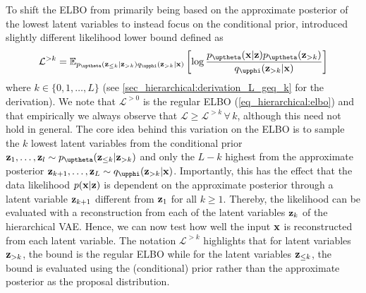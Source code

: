 {To shift the ELBO from primarily being based on the approximate posterior of the lowest latent variables to instead focus on the conditional prior, \textcite{maaloe_biva_2019} introduced slightly different likelihood lower bound defined as
\begin{equation}\label{eq_hierarchical:biva->k}
    \mathcal{L}^{>k} = \mathbb{E}_{p_\thetab(\zb_{\leq k}|\zb_{>k}) q_\phib(\zb_{>k}|\xb)} \left[ \log \frac{p_\thetab(\xb|\zb)p_\thetab(\zb_{>k})}{q_\phib(\zb_{>k}|\xb)} \right]
\end{equation}
where $k\in\{0,1,\dots,L\}$ (see \cref{sec_hierarchical:derivation_L_geq_k} for the derivation).
We note that $\mathcal{L}^{>0}$ is the regular ELBO (\cref{eq_hierarchical:elbo}) and that empirically we always observe that $\mathcal{L}\geq\mathcal{L}^{>k} \, \forall \, k$, although this need not hold in general.
The core idea behind this variation on the ELBO is to sample the $k$ lowest latent variables from the conditional prior $\zb_1,\dots,\zb_l \sim p_\thetab(\zb_{\leq k}|\zb_{>k})$ and only the $L-k$ highest from the approximate posterior $\zb_{k+1},\dots,\zb_L \sim q_\phib(\zb_{>k}|\xb)$.
Importantly, this has the effect that the data likelihood $p({\mathbf{x}}|{\mathbf{z}})$ is dependent on the approximate posterior through a latent variable ${\mathbf{z}}_{k+1}$ different from ${\mathbf{z}}_1$ for all $k \geq 1$.
Thereby, the likelihood can be evaluated with a reconstruction from each of the latent variables ${\mathbf{z}}_k$ of the hierarchical VAE.
Hence, we can now test how well the input ${\mathbf{x}}$ is reconstructed from each latent variable.
The notation $\mathcal{L}^{>k}$ highlights that for latent variables ${\mathbf{z}}_{>k}$, the bound is the regular ELBO while for the latent variables ${\mathbf{z}}_{\leq k}$, the bound is evaluated using the (conditional) prior rather than the approximate posterior as the proposal distribution.


}
